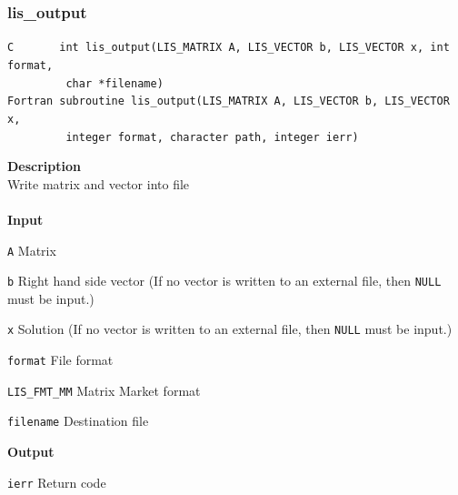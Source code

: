 \documentclass[a4paper]{article}
\newcommand{\namelistlabel}[1]{\mbox{#1}\hfill}
\newenvironment{namelist}[1]{%
 \begin{list}{}
  {\let\makelabel\namelistlabel
  \settowidth{\labelwidth}{#1}
  \setlength{\leftmargin}{1.1\labelwidth}}
}{%
\end{list}}
\begin{document}
  \subsubsection{lis\_output}
\begin{screen}
\verb|C       int lis_output(LIS_MATRIX A, LIS_VECTOR b, LIS_VECTOR x, int format,|\\
\verb|         char *filename)|\\
\verb|Fortran subroutine lis_output(LIS_MATRIX A, LIS_VECTOR b, LIS_VECTOR x,|\\
\verb|         integer format, character path, integer ierr)|
\end{screen}
{\bf Description}\\
\indent
Write matrix and vector into file
\\ \\
\noindent
{\bf Input}
\begin{namelist}{XXXXXXXXXXXXXXXXXXXX}
\item[\tt A] Matrix
\item[\tt b] Right hand side vector (If no vector is written to an external file, then {\tt NULL} must be input.)
\item[\tt x] Solution (If no vector is written to an external file, then {\tt NULL} must be input.)
\item[\tt format] File format
\begin{namelist}{XXXXXXXXXXXXXXXXXXXX}
\item[\tt LIS\_FMT\_MM] Matrix Market format
\end{namelist}
\item[\tt filename] Destination file
\end{namelist}
{\bf Output}
\begin{namelist}{XXXXXXXXXXXXXXXXXXXX}
\item[\tt ierr] Return code
\end{namelist}

\end{document}
